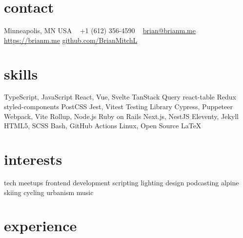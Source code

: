 \documentclass[]{cv-style} %
\begin{document}
\lastupdated


\begin{aside} %
\section{contact}
\small{Minneapolis, MN USA}
~
+1 (612) 356-4590
~
\href{mailto:brian@brianm.me}{brian@brianm.me}
~
\href{https://brianm.me}{https://brianm.me}
\href{https://github.com/BrianMitchL}{github.com/BrianMitchL}
\section{skills}
TypeScript, JavaScript
React, Vue, Svelte
TanStack Query
react-table
Redux
styled-components
PostCSS
Jest, Vitest
Testing Library
Cypress, Puppeteer
Webpack, Vite
Rollup, Node.js
Ruby on Rails
Next.js, NestJS
Eleventy, Jekyll
HTML5, SCSS
Bash, GitHub Actions
Linux, Open Source
\LaTeX
\section{interests}
tech meetups
frontend development
scripting
lighting design
podcasting
alpine skiing
cycling
urbanism
music
\end{aside}



\section{experience}

%
%
%
%
\end{document}
